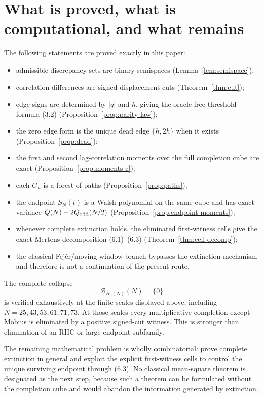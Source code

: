 \documentclass[11pt]{article}
\theoremstyle{definition}
\theoremstyle{remark}
\newcommand{\BH}{\mathcal B}
\begin{document}
\section{What is proved, what is computational, and what remains}

The following statements are proved exactly in this paper:
\begin{itemize}
\item admissible discrepancy sets are binary semispaces (Lemma~\ref{lem:semispace});
\item correlation differences are signed displacement cuts (Theorem~\ref{thm:cut});
\item edge signs are determined by $|q|$ and $h$, giving the oracle-free threshold formula (3.2) (Proposition~\ref{prop:parity-law});
\item the zero edge form is the unique dead edge $\{h,2h\}$ when it exists (Proposition~\ref{prop:dead});
\item the first and second lag-correlation moments over the full completion cube are exact (Proposition~\ref{prop:moments-c});
\item each $G_h$ is a forest of paths (Proposition~\ref{prop:paths});
\item the endpoint $S_N(t)$ is a Walsh polynomial on the same cube and has exact variance $Q(N)-2Q_{\rm odd}(N/2)$ (Proposition~\ref{prop:endpoint-moments});
\item whenever complete extinction holds, the eliminated first-witness cells give the exact Mertens decomposition (6.1)--(6.3) (Theorem~\ref{thm:cell-decomp});
\item the classical Fej\'er/moving-window branch bypasses the extinction mechanism and therefore is not a continuation of the present route.
\end{itemize}

The complete collapse
\[
 \BH_{H_0(N)}(N)=\{0\}
\]
is verified exhaustively at the finite scales displayed above, including $N=25,43,53,61,71,73$.  At those scales every multiplicative completion except M\"obius is eliminated by a positive signed-cut witness.  This is stronger than elimination of an RHC or large-endpoint subfamily.

The remaining mathematical problem is wholly combinatorial: prove complete extinction in general and exploit the explicit first-witness cells to control the unique surviving endpoint through (6.3).  No classical mean-square theorem is designated as the next step, because such a theorem can be formulated without the completion cube and would abandon the information generated by extinction.
\end{document}
